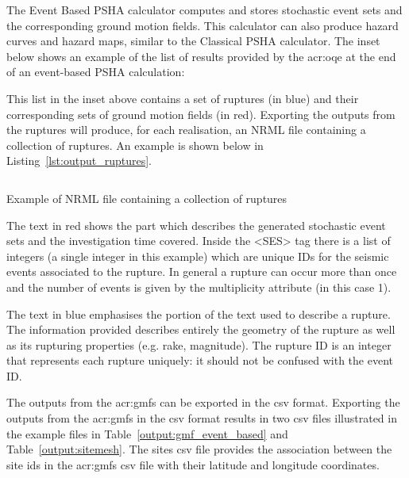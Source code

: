 The Event Based PSHA calculator computes and stores stochastic event sets and
the corresponding ground motion fields. This calculator can also produce
hazard curves and hazard maps, similar to the 
Classical PSHA calculator. The inset below shows an example of the list of
results provided by the \gls{acr:oqe} at the end of an event-based PSHA
calculation:



This list in the inset above contains a set of ruptures (in blue) and their
corresponding sets of ground motion fields (in red). Exporting the outputs
from the ruptures will produce, for each realisation, an NRML file containing
a collection of ruptures. An example is shown below in Listing~\ref{lst:output_ruptures}.


\begin{listing}[htbp]
  \inputminted[firstline=1,firstnumber=1,fontsize=\footnotesize,frame=single,linenos,bgcolor=lightgray]{xml}{oqum/hazard/verbatim/output_ses.xml}
  \caption{Example of NRML file containing a collection of ruptures}
  \label{lst:output_ruptures}
\end{listing}

The text in red shows the part which describes the generated
stochastic event sets and the investigation time covered. Inside the
<SES> tag there is a list of integers (a single integer in this example)
which are unique IDs for the seismic events associated to the rupture.
In general a rupture can occur more than once and the number of events
is given by the multiplicity attribute (in this case 1).

The text in blue emphasises the portion of the text used to describe a
rupture. The information provided describes entirely the geometry of the
rupture as well as its rupturing properties (e.g. rake, magnitude). The
rupture ID is an integer that represents each rupture uniquely: it should
not be confused with the event ID.

The outputs from the \glspl{acr:gmf} can be exported in the csv
format. Exporting the outputs from the \glspl{acr:gmf} in the 
csv format results in two csv files illustrated in the example files in
Table~\ref{output:gmf_event_based} and Table~\ref{output:sitemesh}. The sites csv
file provides the association between the site ids in the \glspl{acr:gmf} csv
file with their latitude and longitude coordinates.




